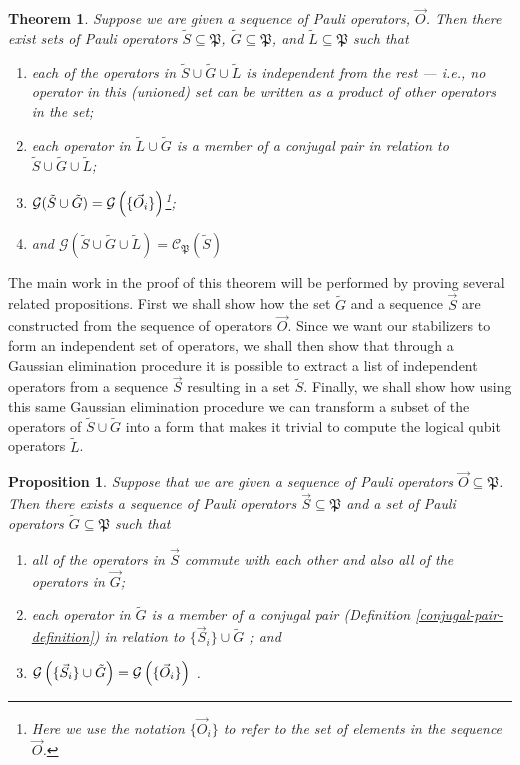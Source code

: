 \documentclass[twocolumn,showpacs,preprintnumbers,amsmath,amssymb,nofootinbib,pra,floatfix]{revtex4-1}
\newtheorem{theorem}{Theorem}
\newtheorem{proposition}{Proposition}
\newenvironment{remark}[1][Remark]{\begin{trivlist}
\item[\hskip \labelsep {\bfseries #1}]}{\end{trivlist}}
\newcommand{\lst}{\vec}
\newcommand{\set}{\tilde}
\newcommand{\genfun}{\mathcal{G}}
\newcommand{\pauligroup}{\mathfrak{P}}
\newcommand{\centralizer}{\mathcal{C}}
\begin{document}
\begin{theorem} \label{theorem-SG} Suppose we are given a sequence of Pauli operators, $\lst O$.  Then there exist sets of Pauli operators $\set S\subseteq\pauligroup$, $\set G\subseteq\pauligroup$, and $\set L\subseteq\pauligroup$ such that
\begin{enumerate}
\item each of the operators in $\set S \cup \set G \cup \set L$ is independent from the rest --- i.e., no operator in this (unioned) set can be written as a product of other operators in the set;
\item each operator in $\set L \cup \set G$ is a member of a conjugal pair in relation to $\set S \cup \set G \cup \set L$;
\item $\genfun(\set S \cup \set G)=\genfun\paren{\{\lst O_i\}}$\footnote{Here we use the notation $\{\vec{O}_i\}$ to refer to the set of elements in the sequence $\vec{O}$.};
\item and $\genfun(\set S \cup \set G \cup \set L)=\centralizer_\pauligroup(\set S)$
\end{enumerate}
\end{theorem}

\begin{remark}
The main work in the proof of this theorem will be performed by proving several related propositions.  First we shall show how the set $\set G$ and a sequence $\lst S$ are constructed from the sequence of operators $\lst O$.  Since we want our stabilizers to form an independent set of operators, we shall then show that through a Gaussian elimination procedure it is possible to extract a list of independent operators from a sequence $\lst S$ resulting in a set $\set S$.  Finally, we shall show how using this same Gaussian elimination procedure we can transform a subset of the operators of $\set S\cup\set G$ into a form that makes it trivial to compute the logical qubit operators $\set L$.
\end{remark}
\begin{proposition} \label{proposition-SG} Suppose that we are given a sequence of Pauli operators $\lst O\subseteq \pauligroup$.  Then there exists a sequence of Pauli operators $\lst S\subseteq\pauligroup$ and a set of Pauli operators $\set G\subseteq\pauligroup$ such that
\begin{enumerate}
\item all of the operators in $\lst S$ commute with each other and also all of the operators in $\lst G$; \label{stabs-commute-with-G}
\item each operator in $\set G$ is a member of a \emph{conjugal pair} (Definition \ref{conjugal-pair-definition}) in relation to $\{\lst S_i\} \cup \set G $ \label{conjugal-pairs-commute-with-SAG}; and
\item $\genfun\paren{\{\lst S_i\}\cup \set G}=\genfun\paren{\{\lst O_i\}}$ \label{SAG-spans-all}.
\end{enumerate}
\end{proposition}
\end{document}
